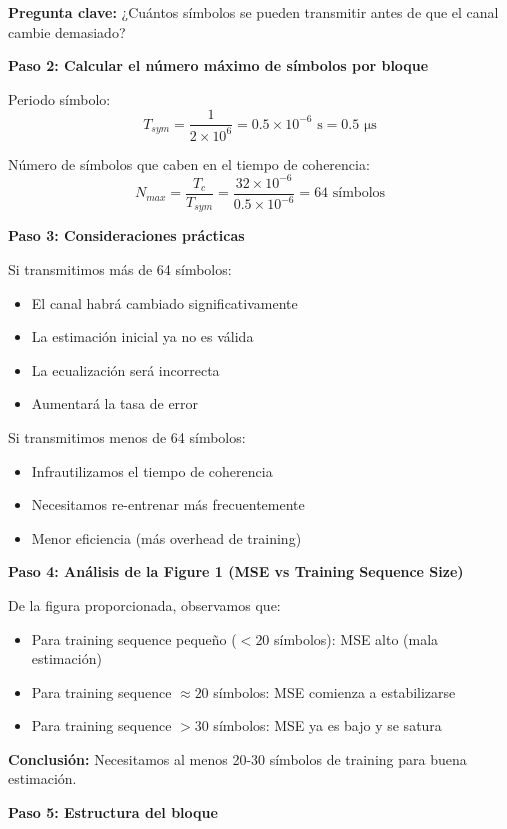 \documentclass[11pt,a4paper]{article}
\begin{document}
\textbf{Pregunta clave:} ¿Cu\'antos s\'imbolos se pueden transmitir antes de que el canal cambie demasiado?

\textbf{Paso 2: Calcular el n\'umero m\'aximo de s\'imbolos por bloque}

Periodo s\'imbolo:
\[
T_{sym} = \frac{1}{2 \times 10^6} = 0.5 \times 10^{-6} \text{ s} = 0.5 \text{ μs}
\]

N\'umero de s\'imbolos que caben en el tiempo de coherencia:
\[
N_{max} = \frac{T_c}{T_{sym}} = \frac{32 \times 10^{-6}}{0.5 \times 10^{-6}} = 64 \text{ s\'imbolos}
\]

\textbf{Paso 3: Consideraciones pr\'acticas}

Si transmitimos m\'as de 64 s\'imbolos:
\begin{itemize}
    \item El canal habr\'a cambiado significativamente
    \item La estimaci\'on inicial ya no es v\'alida
    \item La ecualizaci\'on ser\'a incorrecta
    \item Aumentar\'a la tasa de error
\end{itemize}

Si transmitimos menos de 64 s\'imbolos:
\begin{itemize}
    \item Infrautilizamos el tiempo de coherencia
    \item Necesitamos re-entrenar m\'as frecuentemente
    \item Menor eficiencia (m\'as overhead de training)
\end{itemize}

\textbf{Paso 4: An\'alisis de la Figure 1 (MSE vs Training Sequence Size)}

De la figura proporcionada, observamos que:
\begin{itemize}
    \item Para training sequence peque\~no ($< 20$ s\'imbolos): MSE alto (mala estimaci\'on)
    \item Para training sequence $\approx 20$ s\'imbolos: MSE comienza a estabilizarse
    \item Para training sequence $> 30$ s\'imbolos: MSE ya es bajo y se satura
\end{itemize}

\textbf{Conclusi\'on:} Necesitamos al menos 20-30 s\'imbolos de training para buena estimaci\'on.

\textbf{Paso 5: Estructura del bloque}
\end{document}

